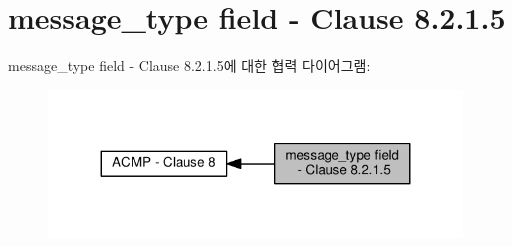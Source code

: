 \hypertarget{group__acmp__message__type}{}\section{message\+\_\+type field -\/ Clause 8.2.1.5}
\label{group__acmp__message__type}
message\+\_\+type field -\/ Clause 8.2.1.5에 대한 협력 다이어그램\+:
\nopagebreak
\begin{figure}[H]
\begin{center}
\leavevmode
\includegraphics[width=311pt]{group__acmp__message__type}
\end{center}
\end{figure}
